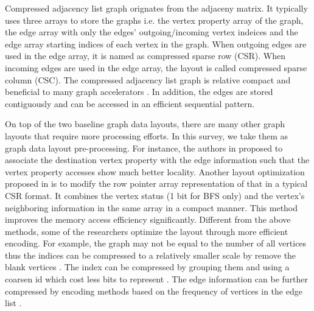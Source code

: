 \documentclass[twoside]{article}
\begin{document}
\begin{multicols}{2}
Compressed adjacency list graph orignates 
from the adjaceny matrix. It typically uses three arrays to store the 
graphs i.e. the vertex property array of the graph, the edge array with 
only the edges' outgoing/incoming vertex indeices and the edge array starting indices 
of each vertex in the graph. When outgoing edges are used in the edge array, 
it is named as compressed sparse row (CSR). When incoming edges are used 
in the edge array, the layout is called compressed 
sparse column (CSC). The compressed adjacency list graph is relative compact and 
beneficial to many graph accelerators \cite{ozdal2016energy,Zhang2017fpgahmcbfs}. 
In addition, the edges are stored contiguously and can be accessed in an efficient 
sequential pattern.

On top of the two baseline graph data layouts, there are many other graph layouts that 
require more processing efforts. In this survey, we 
take them as graph data layout pre-processing. For instance, the authors in proposed to associate the 
destination vertex property with the edge information \cite{Oguntebi2016graphops} such that the vertex 
property accesses show much better locality. Another layout optimization proposed in \cite{attia2014cygraph} 
is to modify the row pointer array representation of that in a typical CSR format. It combines the 
vertex status (1 bit for BFS only) and the vertex's neighboring information in the same array 
in a compact manner. This method improves the memory access efficiency significantly. 
Different from the above methods, some of the researchers optimize the layout through more efficient 
encoding. For example, the graph may not be equal to the number of all vertices thus the indices can be compressed to a relatively smaller scale by remove the blank vertices \cite{dai2018graphh}. The index can be compressed by grouping them and using a coarsen id which cost less bits to represent \cite{Dai2017foregraph,ham2016graphicionado}. The edge information can be further compressed by encoding methods based on the frequency of vertices in the edge list \cite{Zhang2018degreebfsfpga}.


\end{multicols}
\end{document}
